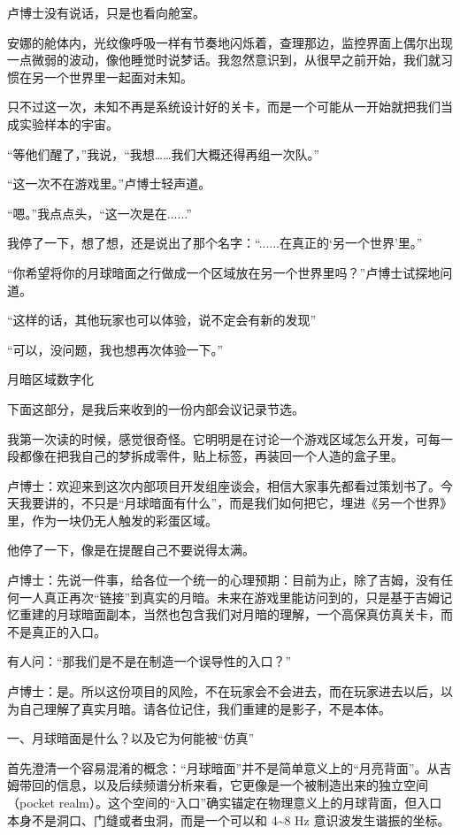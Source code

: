 卢博士没有说话，只是也看向舱室。

安娜的舱体内，光纹像呼吸一样有节奏地闪烁着，查理那边，监控界面上偶尔出现一点微弱的波动，像他睡觉时说梦话。我忽然意识到，从很早之前开始，我们就习惯在另一个世界里一起面对未知。

只不过这一次，未知不再是系统设计好的关卡，而是一个可能从一开始就把我们当成实验样本的宇宙。

“等他们醒了，”我说，“我想……我们大概还得再组一次队。”

“这一次不在游戏里。”卢博士轻声道。

“嗯。”我点点头，“这一次是在......”

我停了一下，想了想，还是说出了那个名字：“......在真正的‘另一个世界’里。”

“你希望将你的月球暗面之行做成一个区域放在另一个世界里吗？”卢博士试探地问道。

“这样的话，其他玩家也可以体验，说不定会有新的发现”

“可以，没问题，我也想再次体验一下。”

月暗区域数字化

下面这部分，是我后来收到的一份内部会议记录节选。

我第一次读的时候，感觉很奇怪。它明明是在讨论一个游戏区域怎么开发，可每一段都像在把我自己的梦拆成零件，贴上标签，再装回一个人造的盒子里。

卢博士：欢迎来到这次内部项目开发组座谈会，相信大家事先都看过策划书了。今天我要讲的，不只是“月球暗面有什么”，而是我们如何把它，埋进《另一个世界》里，作为一块仍无人触发的彩蛋区域。

他停了一下，像是在提醒自己不要说得太满。

卢博士：先说一件事，给各位一个统一的心理预期：目前为止，除了吉姆，没有任何一人真正再次“链接”到真实的月暗。未来在游戏里能访问到的，只是基于吉姆记忆重建的月球暗面副本，当然也包含我们对月暗的理解，一个高保真仿真关卡，而不是真正的入口。

有人问：“那我们是不是在制造一个误导性的入口？”

卢博士：是。所以这份项目的风险，不在玩家会不会进去，而在玩家进去以后，以为自己理解了真实月暗。请各位记住，我们重建的是影子，不是本体。

一、月球暗面是什么？以及它为何能被“仿真”

首先澄清一个容易混淆的概念：“月球暗面”并不是简单意义上的“月亮背面”。从吉姆带回的信息，以及后续频谱分析来看，它更像是一个被制造出来的独立空间（pocket realm）。这个空间的“入口”确实锚定在物理意义上的月球背面，但入口本身不是洞口、门缝或者虫洞，而是一个可以和 4\textasciitilde{}8 Hz 意识波发生谐振的坐标。

